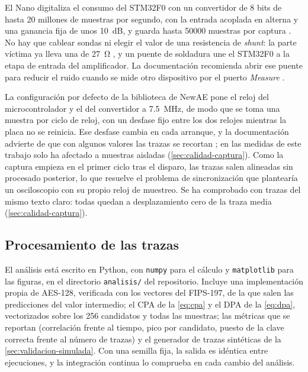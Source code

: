 El Nano digitaliza el consumo del STM32F0 con un convertidor de 8 bits de
hasta 20 millones de muestras por segundo, con la entrada acoplada en alterna y
una ganancia fija de unos \qty{10}{\deci\bel}, y guarda hasta \num{50000} muestras por
captura \cite{cw-nano-docs}. No hay que cablear sondas ni elegir el valor de
una resistencia de \emph{shunt}: la parte víctima ya lleva una de
\qty{27}{\ohm} \cite{cw-nano-target}, y un puente de soldadura une el STM32F0
a la etapa de entrada del amplificador. La documentación recomienda abrir ese
puente para reducir el ruido cuando se mide otro dispositivo por el puerto
\emph{Measure} \cite{cw-nano-docs}.

La configuración por defecto de la biblioteca de NewAE pone el reloj del
microcontrolador y el del convertidor a \qty{7,5}{\mega\hertz}, de modo que se toma una
muestra por ciclo de reloj, con un desfase fijo entre los dos relojes mientras
la placa no se reinicia. Ese desfase cambia en cada arranque, y la
documentación advierte de que con algunos valores las trazas se recortan
\cite{cw-nano-docs}; en las medidas de este trabajo solo ha afectado a
muestras aisladas (\cref{sec:calidad-captura}). Como la captura empieza
en el primer ciclo tras el disparo, las trazas salen alineadas sin procesado
posterior, lo que resuelve el problema de sincronización que plantearía un
osciloscopio con su propio reloj de muestreo. Se ha comprobado con
\realFixedTextTraces{} trazas del mismo texto claro: todas quedan a
desplazamiento cero de la traza media
(\cref{sec:calidad-captura}).

\subsection{Procesamiento de las trazas}

El análisis está escrito en Python, con \texttt{numpy} para el cálculo y
\texttt{matplotlib} para las figuras, en el directorio \texttt{analisis/} del
repositorio. Incluye una implementación propia de AES-128, verificada con los
vectores del FIPS-197, de la que salen las predicciones del valor intermedio; el
CPA de la \cref{eq:cpa} y el DPA de la \cref{eq:dpa}, vectorizados sobre los 256
candidatos y todas las muestras; las métricas que se reportan (correlación
frente al tiempo, pico por candidato, puesto de la clave correcta frente al
número de trazas) y el generador de trazas sintéticas de la
\cref{sec:validacion-simulada}. Con una semilla fija, la salida es idéntica
entre ejecuciones, y la integración continua lo comprueba en cada cambio del
análisis.


